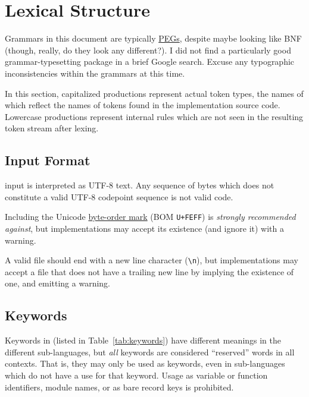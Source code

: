 \section{Lexical Structure}

Grammars in this document are typically
\href{https://en.wikipedia.org/wiki/Parsing_expression_grammar}{PEGs},
despite maybe looking like BNF (though, really, do they look any different?).
I did not find a particularly good grammar-typesetting package in a brief
Google search. Excuse any typographic inconsistencies within the grammars
at this time.

In this section, capitalized productions represent actual token types, the
names of which reflect the names of tokens found in the implementation source
code. Lowercase productions represent internal rules which are not seen in the
resulting token stream after lexing.

\subsection{Input Format}

\Trilogy{} input is interpreted as UTF-8 text. Any sequence of bytes which
does not constitute a valid UTF-8 codepoint sequence is not valid \Trilogy{}
code.

Including the Unicode \href{https://en.wikipedia.org/wiki/Byte_order_mark}{byte-order mark}
(BOM \texttt{U+FEFF}) is \emph{strongly recommended against}, but \Trilogy{}
implementations may accept its existence (and ignore it) with a warning.

A valid \Trilogy{} file should end with a new line character (\texttt{\textbackslash n}),
but \Trilogy{} implementations may accept a file that does not have
a trailing new line by implying the existence of one, and emitting a
warning.

\subsection{Keywords}
\FloatBarrier

Keywords in \Trilogy{} (listed in Table~\ref{tab:keywords}) have
different meanings in the different sub-languages, but \emph{all}
keywords are considered ``reserved'' words in all contexts. That
is, they may only be used as keywords, even in sub-languages which
do not have a use for that keyword. Usage as variable or function
identifiers, module names, or as bare record keys is prohibited.

